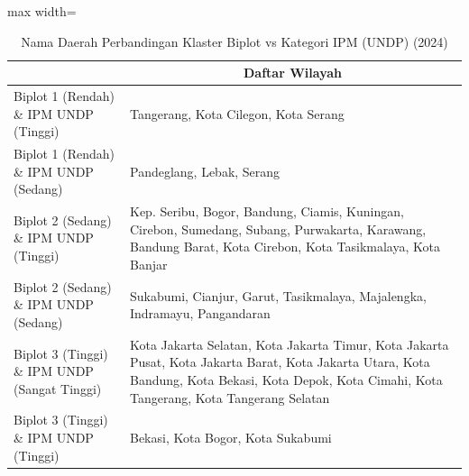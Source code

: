 \begin{table}[H]
\centering
\caption{Nama Daerah Perbandingan Klaster Biplot vs Kategori IPM (UNDP) (2024)} \label{tab:app1crossname2024}
\begin{adjustbox}{max width=\textwidth}
\begin{tabular}{|>{\centering\arraybackslash}p{4cm}|p{10cm}|}
\hline
\multicolumn{1}{|c|}{\textbf{Kategori}} & \multicolumn{1}{c|}{\textbf{Daftar Wilayah}} \\
\hline
Biplot 1 (Rendah) \& IPM UNDP (Tinggi) & Tangerang, Kota Cilegon, Kota Serang \\
\hline
Biplot 1 (Rendah) \& IPM UNDP (Sedang) & Pandeglang, Lebak, Serang \\
\hline
Biplot 2 (Sedang) \& IPM UNDP (Tinggi) & Kep. Seribu, Bogor, Bandung, Ciamis, Kuningan, Cirebon, Sumedang, Subang, Purwakarta, Karawang, Bandung Barat, Kota Cirebon, Kota Tasikmalaya, Kota Banjar \\
\hline
Biplot 2 (Sedang) \& IPM UNDP (Sedang) & Sukabumi, Cianjur, Garut, Tasikmalaya, Majalengka, Indramayu, Pangandaran \\
\hline
Biplot 3 (Tinggi) \& IPM UNDP (Sangat Tinggi) & Kota Jakarta Selatan, Kota Jakarta Timur, Kota Jakarta Pusat, Kota Jakarta Barat, Kota Jakarta Utara, Kota Bandung, Kota Bekasi, Kota Depok, Kota Cimahi, Kota Tangerang, Kota Tangerang Selatan \\
\hline
Biplot 3 (Tinggi) \& IPM UNDP (Tinggi) & Bekasi, Kota Bogor, Kota Sukabumi \\
\hline
\end{tabular}
\end{adjustbox}
\end{table}